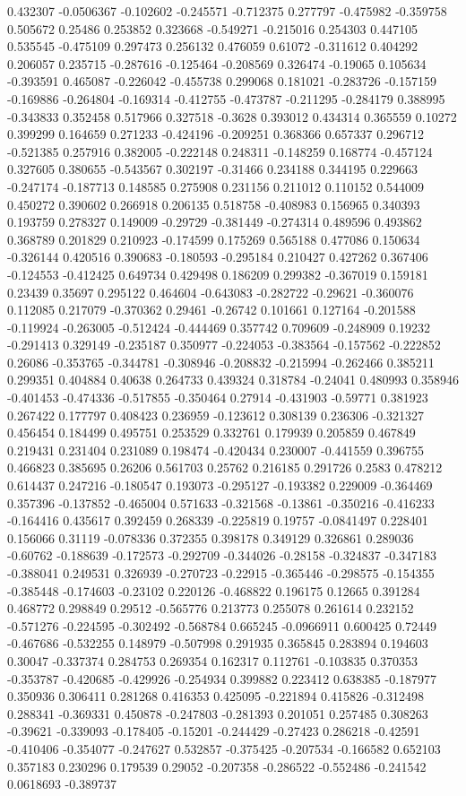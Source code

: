 0.432307 -0.0506367 -0.102602 -0.245571 -0.712375 0.277797 -0.475982 -0.359758 0.505672 0.25486 0.253852 0.323668 -0.549271 -0.215016 0.254303 0.447105 0.535545 -0.475109 0.297473 0.256132 0.476059 0.61072 -0.311612 0.404292 0.206057 0.235715 -0.287616 -0.125464 -0.208569 0.326474 -0.19065 0.105634 -0.393591 0.465087 -0.226042 -0.455738 0.299068 0.181021 -0.283726 -0.157159 -0.169886 -0.264804 -0.169314 -0.412755 -0.473787 -0.211295 -0.284179 0.388995 -0.343833 0.352458 0.517966 0.327518 -0.3628 0.393012 0.434314 0.365559 0.10272 0.399299 0.164659 0.271233 -0.424196 -0.209251 0.368366 0.657337 0.296712 -0.521385 0.257916 0.382005 -0.222148 0.248311 -0.148259 0.168774 -0.457124 0.327605 0.380655 -0.543567 0.302197 -0.31466 0.234188 0.344195 0.229663 -0.247174 -0.187713 0.148585 0.275908 0.231156 0.211012 0.110152 0.544009 0.450272 0.390602 0.266918 0.206135 0.518758 -0.408983 0.156965 0.340393 0.193759 0.278327 0.149009 -0.29729 -0.381449 -0.274314 0.489596 0.493862 0.368789 0.201829 0.210923 -0.174599 0.175269 0.565188 0.477086 0.150634 -0.326144 0.420516 0.390683 -0.180593 -0.295184 0.210427 0.427262 0.367406 -0.124553 -0.412425 0.649734 0.429498 0.186209 0.299382 -0.367019 0.159181 0.23439 0.35697 0.295122 0.464604 -0.643083 -0.282722 -0.29621 -0.360076 0.112085 0.217079 -0.370362 0.29461 -0.26742 0.101661 0.127164 -0.201588 -0.119924 -0.263005 -0.512424 -0.444469 0.357742 0.709609 -0.248909 0.19232 -0.291413 0.329149 -0.235187 0.350977 -0.224053 -0.383564 -0.157562 -0.222852 0.26086 -0.353765 -0.344781 -0.308946 -0.208832 -0.215994 -0.262466 0.385211 0.299351 0.404884 0.40638 0.264733 0.439324 0.318784 -0.24041 0.480993 0.358946 -0.401453 -0.474336 -0.517855 -0.350464 0.27914 -0.431903 -0.59771 0.381923 0.267422 0.177797 0.408423 0.236959 -0.123612 0.308139 0.236306 -0.321327 0.456454 0.184499 0.495751 0.253529 0.332761 0.179939 0.205859 0.467849 0.219431 0.231404 0.231089 0.198474 -0.420434 0.230007 -0.441559 0.396755 0.466823 0.385695 0.26206 0.561703 0.25762 0.216185 0.291726 0.2583 0.478212 0.614437 0.247216 -0.180547 0.193073 -0.295127 -0.193382 0.229009 -0.364469 0.357396 -0.137852 -0.465004 0.571633 -0.321568 -0.13861 -0.350216 -0.416233 -0.164416 0.435617 0.392459 0.268339 -0.225819 0.19757 -0.0841497 0.228401 0.156066 0.31119 -0.078336 0.372355 0.398178 0.349129 0.326861 0.289036 -0.60762 -0.188639 -0.172573 -0.292709 -0.344026 -0.28158 -0.324837 -0.347183 -0.388041 0.249531 0.326939 -0.270723 -0.22915 -0.365446 -0.298575 -0.154355 -0.385448 -0.174603 -0.23102 0.220126 -0.468822 0.196175 0.12665 0.391284 0.468772 0.298849 0.29512 -0.565776 0.213773 0.255078 0.261614 0.232152 -0.571276 -0.224595 -0.302492 -0.568784 0.665245 -0.0966911 0.600425 0.72449 -0.467686 -0.532255 0.148979 -0.507998 0.291935 0.365845 0.283894 0.194603 0.30047 -0.337374 0.284753 0.269354 0.162317 0.112761 -0.103835 0.370353 -0.353787 -0.420685 -0.429926 -0.254934 0.399882 0.223412 0.638385 -0.187977 0.350936 0.306411 0.281268 0.416353 0.425095 -0.221894 0.415826 -0.312498 0.288341 -0.369331 0.450878 -0.247803 -0.281393 0.201051 0.257485 0.308263 -0.39621 -0.339093 -0.178405 -0.15201 -0.244429 -0.27423 0.286218 -0.42591 -0.410406 -0.354077 -0.247627 0.532857 -0.375425 -0.207534 -0.166582 0.652103 0.357183 0.230296 0.179539 0.29052 -0.207358 -0.286522 -0.552486 -0.241542 0.0618693 -0.389737 
